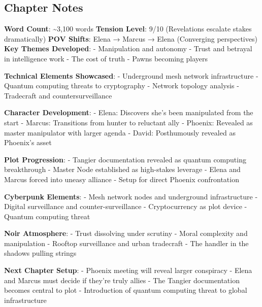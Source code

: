 \hypertarget{chapter-notes}{%
\subsection{Chapter Notes}\label{chapter-notes}}

\textbf{Word Count}: \textasciitilde3,100 words \textbf{Tension Level}: 9/10 (Revelations escalate stakes dramatically) \textbf{POV Shifts}: Elena → Marcus → Elena (Converging perspectives) \textbf{Key Themes Developed}: - Manipulation and autonomy - Trust and betrayal in intelligence work - The cost of truth - Pawns becoming players

\textbf{Technical Elements Showcased}: - Underground mesh network infrastructure - Quantum computing threats to cryptography - Network topology analysis - Tradecraft and countersurveillance

\textbf{Character Development}: - Elena: Discovers she's been manipulated from the start - Marcus: Transitions from hunter to reluctant ally - Phoenix: Revealed as master manipulator with larger agenda - David: Posthumously revealed as Phoenix's asset

\textbf{Plot Progression}: - Tangier documentation revealed as quantum computing breakthrough - Master Node established as high-stakes leverage - Elena and Marcus forced into uneasy alliance - Setup for direct Phoenix confrontation

\textbf{Cyberpunk Elements}: - Mesh network nodes and underground infrastructure - Digital surveillance and counter-surveillance - Cryptocurrency as plot device - Quantum computing threat

\textbf{Noir Atmosphere}: - Trust dissolving under scrutiny - Moral complexity and manipulation - Rooftop surveillance and urban tradecraft - The handler in the shadows pulling strings

\textbf{Next Chapter Setup}: - Phoenix meeting will reveal larger conspiracy - Elena and Marcus must decide if they're truly allies - The Tangier documentation becomes central to plot - Introduction of quantum computing threat to global infrastructure
